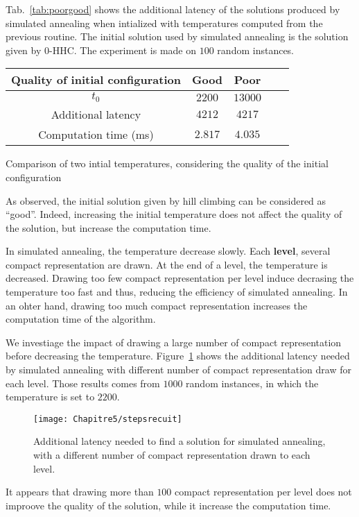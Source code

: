  Tab.~\ref{tab:poorgood} shows the additional latency of the solutions produced by simulated annealing when intialized with temperatures computed from the previous routine. The initial solution used by simulated annealing is the solution given by $0$-HHC. The experiment is made on $100$ random instances.
\begin{center}
\begin{tabular}{ |c|c|c|c|c| }
\hline
 Quality of initial configuration & Good& Poor\\
    \hline
    $t_0$ & $2200$& $13000$\\
    \hline
    Additional latency & $4212$ & $4217$ \\
        \hline
    Computation time (ms) &  $2.817$&$4.035$ \\

    \hline
    
 \end{tabular}
 \caption{Comparison of two intial temperatures, considering the quality of the initial configuration}
     \label{tab:poorgood}
 \end{center}
 As observed, the initial solution given by hill climbing can be considered as ``good''. Indeed, increasing the initial temperature does not affect the quality of the solution, but increase the computation time.
 
 In simulated annealing, the temperature decrease slowly. Each \textbf{level}, several compact representation are drawn. At the end of a level, the temperature is decreased. Drawing too few compact representation per level induce decrasing the temperature too fast and thus, reducing the efficiency of simulated annealing. In an ohter hand, drawing too much compact representation increases the computation time of the algorithm.
  
 We investiage the impact of drawing a large number of compact representation before decreasing the temperature. Figure~\ref{fig:stepsrecuit} shows the additional latency needed by simulated annealing with different number of compact representation draw for each level. Those results comes from $1000$ random instances, in which the temperature is set to $2200$.
 
 \begin{figure}[h]
	\centering
	\texttt{[image: Chapitre5/stepsrecuit]}
\caption{ Additional latency needed to find a solution for simulated annealing, with a different number of compact representation drawn to each level.}
\label{fig:stepsrecuit}
\end{figure}
It appears that drawing more than $100$ compact representation per level does not improove the quality of the solution, while it increase the computation time.

